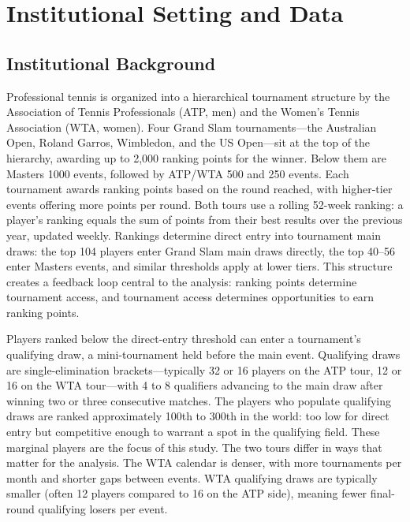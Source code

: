 \section{Institutional Setting and Data}
\label{sec:data}

\subsection{Institutional Background}
\label{sec:data_institutional}

Professional tennis is organized into a hierarchical tournament structure by the Association of Tennis Professionals (ATP, men) and the Women's Tennis Association (WTA, women). Four Grand Slam tournaments---the Australian Open, Roland Garros, Wimbledon, and the US Open---sit at the top of the hierarchy, awarding up to 2,000 ranking points for the winner. Below them are Masters 1000 events, followed by ATP/WTA 500 and 250 events. Each tournament awards ranking points based on the round reached, with higher-tier events offering more points per round. Both tours use a rolling 52-week ranking: a player's ranking equals the sum of points from their best results over the previous year, updated weekly. Rankings determine direct entry into tournament main draws: the top 104 players enter Grand Slam main draws directly, the top 40--56 enter Masters events, and similar thresholds apply at lower tiers. This structure creates a feedback loop central to the analysis: ranking points determine tournament access, and tournament access determines opportunities to earn ranking points.

Players ranked below the direct-entry threshold can enter a tournament's qualifying draw, a mini-tournament held before the main event. Qualifying draws are single-elimination brackets---typically 32 or 16 players on the ATP tour, 12 or 16 on the WTA tour---with 4 to 8 qualifiers advancing to the main draw after winning two or three consecutive matches. The players who populate qualifying draws are ranked approximately 100th to 300th in the world: too low for direct entry but competitive enough to warrant a spot in the qualifying field. These marginal players are the focus of this study. The two tours differ in ways that matter for the analysis. The WTA calendar is denser, with more tournaments per month and shorter gaps between events. WTA qualifying draws are typically smaller (often 12 players compared to 16 on the ATP side), meaning fewer final-round qualifying losers per event.

